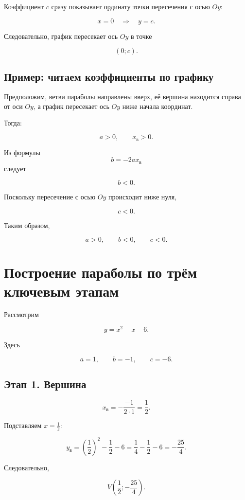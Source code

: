 \documentclass[a4paper,12pt]{article}
\begin{document}
Коэффициент \(c\) сразу показывает ординату точки пересечения с осью \(Oy\):

\[
x=0
\quad\Longrightarrow\quad
y=c.
\]

Следовательно, график пересекает ось \(Oy\) в точке

\[
\boxed{(0;c)}.
\]

\subsection{Пример: читаем коэффициенты по графику}

Предположим, ветви параболы направлены вверх, её вершина находится справа от
оси \(Oy\), а график пересекает ось \(Oy\) ниже начала координат.

Тогда:

\[
a>0,\qquad x_{\mathrm{в}}>0.
\]

Из формулы
\[
b=-2ax_{\mathrm{в}}
\]
следует

\[
\boxed{b<0}.
\]

Поскольку пересечение с осью \(Oy\) происходит ниже нуля,

\[
\boxed{c<0}.
\]

Таким образом,

\[
\boxed{a>0,\qquad b<0,\qquad c<0}.
\]

\section{Построение параболы по трём ключевым этапам}

Рассмотрим

\[
\boxed{y=x^2-x-6}.
\]

Здесь

\[
a=1,\qquad b=-1,\qquad c=-6.
\]

\subsection{Этап 1. Вершина}

\[
x_{\mathrm{в}}
=
-\frac{-1}{2\cdot1}
=
\frac12.
\]

Подставляем \(x=\frac12\):

\[
y_{\mathrm{в}}
=
\left(\frac12\right)^2
-\frac12
-6
=
\frac14-\frac12-6
=
-\frac{25}{4}.
\]

Следовательно,

\[
\boxed{
V\left(\frac12;-\frac{25}{4}\right)
}.
\]
\end{document}
